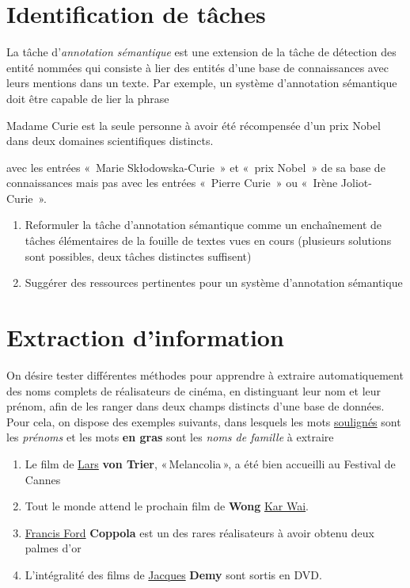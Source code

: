\documentclass[a4paper, 11pt]{article}
\begin{document}
\section{Identification de tâches}
La tâche d'\emph{annotation sémantique} est une extension de la tâche de détection des entité nommées qui consiste à lier des entités d'une base de connaissances avec leurs mentions dans un texte.
Par exemple, un système d'annotation sémantique doit être capable de lier la phrase
\begin{displayquote}
    Madame Curie est la seule personne à avoir été récompensée d'un prix Nobel dans deux domaines scientifiques distincts.
\end{displayquote}
avec les entrées « Marie Skłodowska-Curie » et « prix Nobel » de sa base de connaissances mais pas avec les entrées « Pierre Curie » ou « Irène Joliot-Curie ».

\begin{enumerate}
    \item Reformuler la tâche d'annotation sémantique comme un enchaînement de tâches élémentaires de la fouille de textes vues en cours (plusieurs solutions sont possibles, deux tâches distinctes suffisent)
    \item Suggérer des ressources pertinentes pour un système d'annotation sémantique
\end{enumerate}


\section{Extraction d'information}
On désire tester différentes méthodes pour apprendre à extraire automatiquement des noms complets de réalisateurs de cinéma, en distinguant leur nom et leur prénom, afin de les ranger dans deux champs distincts d'une base de données.
Pour cela, on dispose des exemples suivants, dans lesquels les mots \underline{soulignés} sont
les \emph{prénoms} et les mots \textbf{en gras} sont les \emph{noms de famille} à extraire

\begin{enumerate}
    \item\label{ex|extr|expl1} Le film de \underline{Lars} \textbf{von Trier}, « Melancolia », a été bien accueilli au Festival de Cannes
    \item Tout le monde attend le prochain film de \textbf{Wong} \underline{Kar Wai}.
    \item \underline{Francis Ford} \textbf{Coppola} est un des rares réalisateurs à avoir obtenu deux palmes d'or
    \item L'intégralité des films de \underline{Jacques} \textbf{Demy} sont sortis en DVD.
\end{enumerate}
\end{document}
